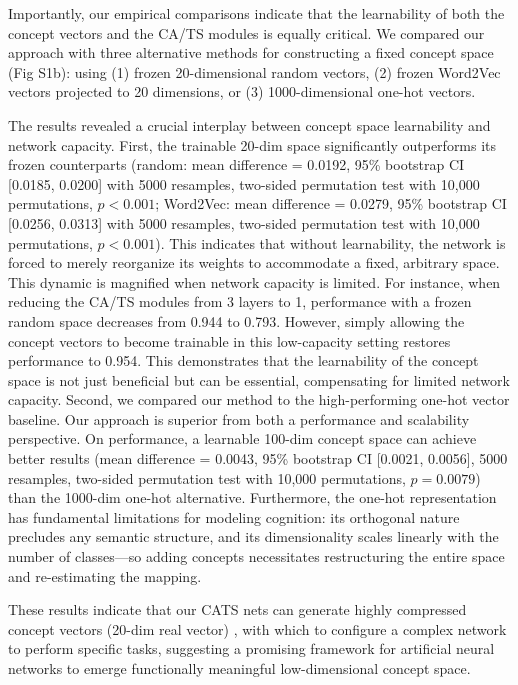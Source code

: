 \documentclass[pdflatex,sn-mathphys-num,lineno]{sn-jnl}%
\begin{document}
\begin{CJK}{UTF8}{gbsn}
Importantly, our empirical comparisons indicate that the learnability of both the concept vectors and the CA/TS modules is equally critical. We compared our approach with three alternative methods for constructing a fixed concept space (Fig S1b): using (1) frozen 20-dimensional random vectors, (2) frozen Word2Vec vectors projected to 20 dimensions, or (3) 1000-dimensional one-hot vectors.

The results revealed a crucial interplay between concept space learnability and network capacity. First, the trainable 20-dim space significantly outperforms its frozen counterparts (random: mean difference = 0.0192, 95\% bootstrap CI [0.0185, 0.0200] with 5000 resamples, two-sided permutation test with 10,000 permutations, $p < 0.001$; Word2Vec: mean difference = 0.0279, 95\% bootstrap CI [0.0256, 0.0313] with 5000 resamples, two-sided permutation test with 10,000 permutations, $p < 0.001$). This indicates that without learnability, the network is forced to merely reorganize its weights to accommodate a fixed, arbitrary space. This dynamic is magnified when network capacity is limited. For instance, when reducing the CA/TS modules from 3 layers to 1, performance with a frozen random space decreases from 0.944 to 0.793. However, simply allowing the concept vectors to become trainable in this low-capacity setting restores performance to 0.954. This demonstrates that the learnability of the concept space is not just beneficial but can be essential, compensating for limited network capacity. Second, we compared our method to the high-performing one-hot vector baseline. Our approach is superior from both a performance and scalability perspective. On performance, a learnable 100-dim concept space can achieve better results (mean difference = 0.0043, 95\% bootstrap CI [0.0021, 0.0056], 5000 resamples, two-sided permutation test with 10,000 permutations, $p = 0.0079$) than the 1000-dim one-hot alternative. Furthermore, the one-hot representation has fundamental limitations for modeling cognition: its orthogonal nature precludes any semantic structure, and its dimensionality scales linearly with the number of classes---so adding concepts necessitates restructuring the entire space and re-estimating the mapping.

These results indicate that our CATS nets can generate highly compressed concept vectors (20-dim real vector) , with which to configure a complex network to perform specific tasks, suggesting a promising framework for artificial neural networks to emerge functionally meaningful low-dimensional concept space. 


\end{CJK}
\end{document}
